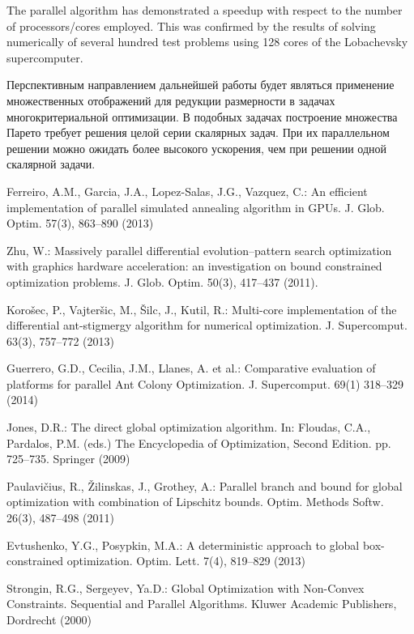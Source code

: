 \documentclass[smallextended]{svjour3}       %
\begin{document}
The parallel algorithm has demonstrated a speedup with respect to the number of processors/cores employed. This was confirmed by the results of solving numerically of several hundred test problems using 128 cores of the Lobachevsky supercomputer. 

\Russian
Перспективным направлением дальнейшей работы будет являться применение множественных отображений для редукции размерности в задачах многокритериальной оптимизации. В подобных задачах построение множества Парето требует решения целой серии скалярных задач. При их параллельном решении можно ожидать более высокого ускорения, чем при решении одной скалярной задачи. 




\begin{thebibliography}{}

Ferreiro, A.M., Garcia, J.A., Lopez-Salas, J.G., Vazquez, C.: An efficient implementation of parallel simulated annealing algorithm in GPUs. J. Glob. Optim. 57(3), 863--890 (2013)

Zhu, W.: Massively parallel differential evolution--pattern search optimization with graphics hardware acceleration: an investigation on bound constrained optimization problems. J. Glob. Optim. 50(3), 417--437 (2011).

Koro\v sec, P., Vajter\v sic, M.,  \v Silc, J., Kutil, R.: Multi-core implementation of the differential ant-stigmergy algorithm for numerical optimization. J. Supercomput. 63(3), 757--772 (2013)

Guerrero, G.D., Cecilia, J.M., Llanes, A. et al.: Comparative evaluation of platforms for parallel Ant Colony Optimization. J. Supercomput. 69(1) 318--329 (2014)

Jones, D.R.: The direct global optimization algorithm. In: Floudas, C.A., Pardalos, P.M. (eds.) The Encyclopedia of Optimization, Second Edition. pp. 725--735. Springer (2009)

Paulavi\v cius, R., \v Zilinskas, J., Grothey, A.: Parallel branch and bound for global optimization with combination of Lipschitz bounds. Optim. Methods Softw. 26(3), 487--498 (2011)

Evtushenko, Y.G., Posypkin, M.A.: A deterministic approach to global box-constrained optimization. Optim. Lett. 7(4), 819--829 (2013)

Strongin, R.G., Sergeyev, Ya.D.: Global Optimization with Non-Convex Constraints. Sequential and Parallel Algorithms. Kluwer Academic Publishers, Dordrecht (2000)


\end{thebibliography}
\end{document}
